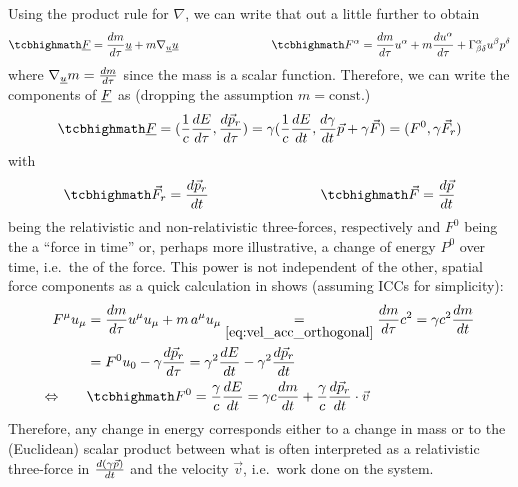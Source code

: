 \documentclass[../relativity_main.tex]{subfiles}
\begin{document}
Using the product rule for $\nabla$, we can write that out a little further to obtain
\begin{equation}\label{eq:eq_of_motion_2}
	\eqbox{
	\fvec{F}%
	= \dv{m}{\tau} \fvec{u} + m \nabla_{\fvec{u}} \fvec{u}
	}
	\manyqquad
	\eqbox{
	F^\alpha = \dv{m}{\tau} u^\alpha + m \dv{u^\alpha}{\tau} + \Gamma^\alpha_{\beta \delta} u^\beta p^\delta
	}
\end{equation}
where $\nabla_{\underline{u}} m = \dv{m}{\tau}$ since the mass is a scalar function. Therefore, we can write the components of $\underline{F}$ as (dropping the assumption $m = \text{const.}$)
\begin{equation}\label{eq:four_force}
	\eqbox{
	\fvec{F} = (\frac{1}{c} \dv{E}{\tau}, \dv{\vec{p}_r}{\tau}) = \gamma (\frac{1}{c} \dv{E}{t}, \dv{\gamma}{t} \vec{p} + \gamma \vec{F}) = (F^0, \gamma \vec{F}_r)
	}
\end{equation}
with
\begin{equation}\label{eq:rel_four_force}
	\eqbox{
	\vec{F}_r = \dv{\vec{p}_r}{t}
	}
	\manyqquad
	\eqbox{
	\vec{F} = \dv{\vec{p}}{t}
	}
\end{equation}
being the relativistic and non-relativistic three-forces, respectively and $F^0$ being the a \enquote{force in time} or, perhaps more illustrative, a change of energy $P^0$ over time, i.e.~the  of the force. This power is not independent of the other, spatial force components as a quick calculation in shows (assuming ICCs for simplicity):
\begin{align}
	F^\mu u_\mu &= \dv{m}{\tau} u^\mu u_\mu + m \, a^\mu u_\mu \underset{\eqref{eq:vel_acc_orthogonal}}{=} \dv{m}{\tau} c^2 = \gamma c^2 \dv{m}{t}
	\notag\\
	&= F^0 u_0 - \gamma \dv{\vec{p}_r}{\tau} = \gamma^2 \dv{E}{t} - \gamma^2 \dv{\vec{p}_r}{t}
	\notag\\
	\Leftrightarrow \qquad &
	\eqbox{
	F^0 = \frac{\gamma}{c} \dv{E}{t} = \gamma c \dv{m}{t} + \frac{\gamma}{c} \dv{\vec{p}_r}{t} \cdot \vec{v}
	}
\end{align}
Therefore, any change in energy corresponds either to a change in mass or to the (Euclidean) scalar product between what is often interpreted as a relativistic three-force in $\dv{(\gamma \vec{p})}{t}$ and the velocity $\vec{v}$, i.e.~work done on the system.\\
\end{document}
